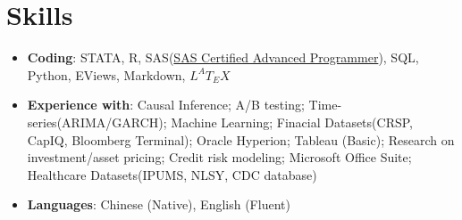 \documentclass{resume}
\begin{document}

\section{Skills}
\begin{itemize}[parsep=0.25ex]
  \item \textbf{Coding}:
    STATA, R, SAS(\href{https://www.youracclaim.com/badges/c4bce10e-7398-4203-9d11-f9c6723749a4/linked_in_profile}{SAS Certified Advanced Programmer}), SQL, Python, EViews, Markdown, $L^{A}T_{E}X$

  \item \textbf{Experience with}:
   Causal Inference; A/B testing; Time-series(ARIMA/GARCH); Machine Learning; Finacial Datasets(CRSP, CapIQ, Bloomberg Terminal); Oracle Hyperion; Tableau (Basic); Research on investment/asset pricing; Credit risk modeling; Microsoft Office Suite; Healthcare Datasets(IPUMS, NLSY, CDC database)
   

 \item \textbf{Languages}: 
  Chinese (Native), English (Fluent)  
 
  
\end{itemize}

\end{document}
